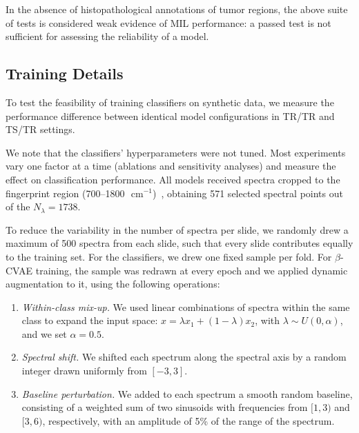 \documentclass[12pt]{article}
\theoremstyle{paper}
\begin{document}

In the absence of histopathological annotations of tumor regions, the above suite of tests is considered weak evidence of MIL performance: a passed test is not sufficient for assessing the reliability of a model.

\subsection{Training Details}
To test the feasibility of training classifiers on synthetic data, we measure the performance difference between identical model configurations in TR/TR and TS/TR settings.

We note that the classifiers' hyperparameters were not tuned. Most experiments vary one factor at a time (ablations and sensitivity analyses) and measure the effect on classification performance. All models received spectra cropped to the fingerprint region (700--1800 $\text{ cm}^{-1}$)~\cite{Harris2023}, obtaining 571 selected spectral points out of the $N_\lambda = 1738$.

To reduce the variability in the number of spectra per slide, we randomly drew a maximum of 500 spectra from each slide, such that every slide contributes equally to the training set. For the classifiers, we drew one fixed sample per fold. For $\beta$-CVAE training, the sample was redrawn at every epoch and we applied dynamic augmentation to it, using the following operations: 
\begin{enumerate}[label=(\alph*)]
    \item \textit{Within-class mix-up.} We used linear combinations of spectra within the same class to expand the input space: $x = \lambda x_1 + (1-\lambda) x_2$, with $\lambda \sim U(0,\alpha)$, and we set $\alpha = 0.5$.
    \item \textit{Spectral shift.} We shifted each spectrum along the spectral axis by a random integer drawn uniformly from $[-3,3]$.
    \item \textit{Baseline perturbation.} We added to each spectrum a smooth random baseline, consisting of a weighted sum of two sinusoids with frequencies from $[1,3)$ and $[3,6)$, respectively, with an amplitude of 5\% of the range of the spectrum.
\end{enumerate}
\end{document}

